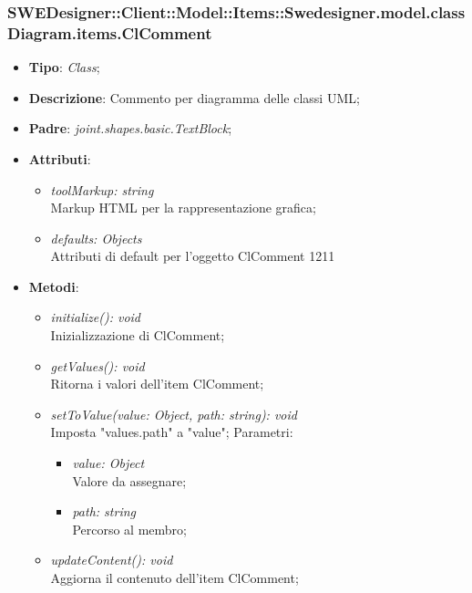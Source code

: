 \documentclass[../DefinizioneDiProdotto.tex]{subfiles}
\begin{document}
			\subsubsection{SWEDesigner::Client::Model::Items::Swedesigner.model.classDiagram.items.ClComment}
			\hypertarget{SWEDesigner::Client::Model::Items::Swedesigner.model.classDiagram.items.ClComment}{}
			\begin{itemize}
				\item \textbf{Tipo}: \emph{Class};
				\item \textbf{Descrizione}: Commento per diagramma delle classi UML;
				\item \textbf{Padre}: \emph{joint.shapes.basic.TextBlock};
				\item \textbf{Attributi}:
				\begin{itemize}
					\item \emph{toolMarkup: string}\\
					Markup HTML per la rappresentazione grafica;
					\item \emph{defaults: Objects}\\
					Attributi di default per l'oggetto ClComment 1211
				\end{itemize}
				\item \textbf{Metodi}:
				\begin{itemize}
					\item \emph{initialize(): void}\\
					Inizializzazione di ClComment;
					\item \emph{getValues(): void}\\
					Ritorna i valori dell'item ClComment;
					\item \emph{setToValue(value: Object, path: string): void}\\
					Imposta "values.path" a "value";
					Parametri:
					\begin{itemize}
						\item \emph{value: Object} \\
						Valore da assegnare;
						\item \emph{path: string} \\
						Percorso al membro;
					\end{itemize}
					\item \emph{updateContent(): void}\\
					Aggiorna il contenuto dell'item ClComment;	
				\end{itemize}
			\end{itemize}
			
\end{document}
